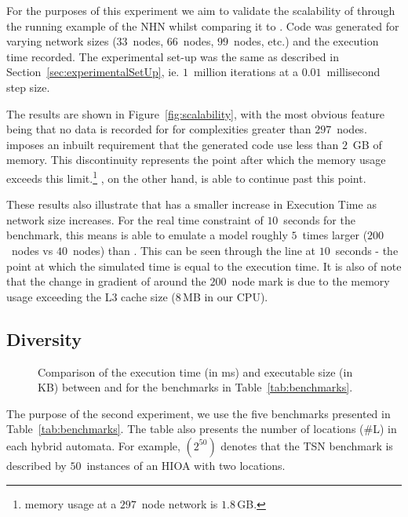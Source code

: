 For the purposes of this experiment we aim to validate the scalability of
\ourTool through the running example of the \ac{NHN} whilst comparing it
to \simulink.  Code was generated for varying network sizes ($33$~nodes,
$66$~nodes, $99$~nodes, etc.) and the execution time recorded.  The
experimental set-up was the same as described in
Section~\ref{sec:experimentalSetUp}, ie. $1$~million iterations at a
$0.01$~millisecond step size.

The results are shown in Figure~\ref{fig:scalability}, with the most
obvious feature being that no data is recorded for \simulink for
complexities greater than $297$~nodes.  \simulink imposes an inbuilt
requirement that the generated code use less than $2$~GB of memory. This
discontinuity represents the point after which the memory usage exceeds
this limit.\footnote{\simulink memory usage at a $297$~node network is 
$1.8$\,GB.}  \ourTool, on the other hand, is able to continue past this
point.

These results also illustrate that \ourTool has a smaller increase in
Execution Time as network size increases. For the real time constraint of 
$10$~seconds for the benchmark, this means \ourTool is able to emulate a model 
roughly $5$~times larger ($200$~nodes vs $40$~nodes) than \simulink.  This 
can be seen through the line at $10$~seconds - the point at which the simulated 
time is equal to the execution time.  It is also of note that the change in 
gradient of \ourTool around the $200$~node mark is due to the memory usage 
exceeding the L$3$ cache size ($8$\,MB in our CPU).


\subsection{Diversity}
\label{sec:diversity}

\begin{figure}[htbp]
  \centering
  \caption{Comparison of the execution time (in ms) and executable size
    (in KB) between \simulink and \ourTool for the benchmarks in
    Table~\ref{tab:benchmarks}.}
  \label{fig:results}
\end{figure}

The purpose of the second experiment, we use the five benchmarks
presented in Table~\ref{tab:benchmarks}.  The table also presents the
number of locations (\#L) in each hybrid automata.  For example,
$(2^{50})$ denotes that the \acf{TSN} benchmark is described by $50$~instances 
of an \ac{HIOA} with two locations.

